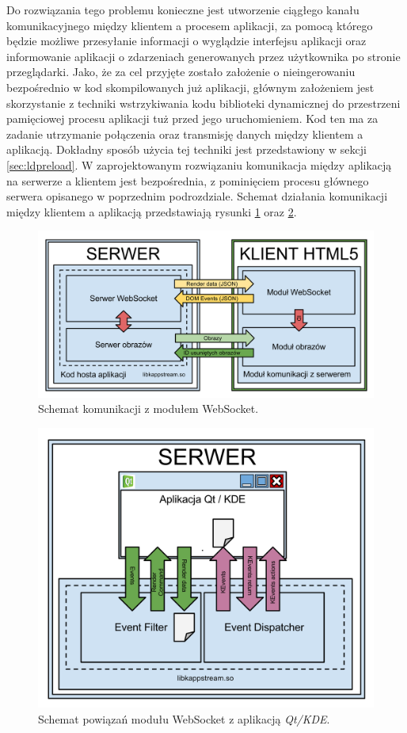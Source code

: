Do rozwiązania tego problemu konieczne jest utworzenie ciągłego kanału komunikacyjnego między klientem a procesem aplikacji, za pomocą którego będzie możliwe przesyłanie informacji o wyglądzie interfejsu aplikacji oraz informowanie aplikacji o zdarzeniach generowanych przez użytkownika po stronie przeglądarki. Jako, że za cel przyjęte zostało założenie o nieingerowaniu bezpośrednio w kod skompilowanych już aplikacji, głównym założeniem jest skorzystanie z techniki wstrzykiwania kodu biblioteki dynamicznej do przestrzeni pamięciowej procesu aplikacji tuż przed jego uruchomieniem. Kod ten ma za zadanie utrzymanie połączenia oraz transmisję danych między klientem a aplikacją. Dokładny sposób użycia tej techniki jest przedstawiony w sekcji \ref{sec:ldpreload}. W zaprojektowanym rozwiązaniu komunikacja między aplikacją na serwerze a klientem jest bezpośrednia, z pominięciem procesu głównego serwera opisanego w poprzednim podrozdziale. Schemat działania komunikacji między klientem a aplikacją przedstawiają rysunki \ref{fig:arch-socket} oraz \ref{fig:arch-hook}.

\begin{figure}[H]
\centering
\includegraphics[width=1.0\linewidth]{img/arch-socket}
\caption{Schemat komunikacji z modułem WebSocket.}
\label{fig:arch-socket}
\end{figure}

\begin{figure}[H]
\centering
\includegraphics[width=1.0\linewidth]{img/arch-hook}
\caption{Schemat powiązań modułu WebSocket z aplikacją \emph{Qt/KDE}.}
\label{fig:arch-hook}
\end{figure}